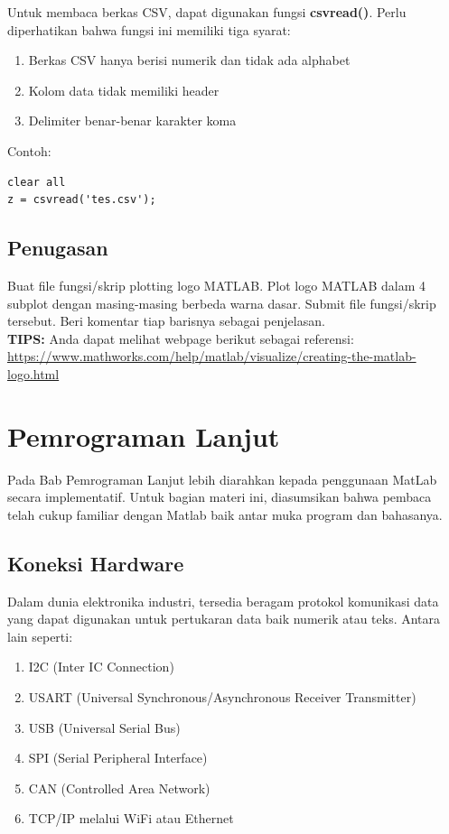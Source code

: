 \documentclass[12pt]{book}
\begin{document}
	Untuk membaca berkas CSV, dapat digunakan fungsi \textbf{csvread()}.
	Perlu diperhatikan bahwa fungsi ini memiliki tiga syarat:
	\begin{enumerate}
		\item Berkas CSV hanya berisi numerik dan tidak ada alphabet
		\item Kolom data tidak memiliki header
		\item Delimiter benar-benar karakter koma
	\end{enumerate}
	Contoh:
	\begin{verbatim}
clear all
z = csvread('tes.csv');
	\end{verbatim}

	\newpage
	\section{Penugasan}

	Buat file fungsi/skrip plotting logo MATLAB.
	Plot logo MATLAB dalam 4 subplot dengan masing-masing berbeda warna dasar.
	Submit file fungsi/skrip tersebut.
	Beri komentar tiap barisnya sebagai penjelasan.\\

	\textbf{TIPS:} Anda dapat melihat webpage berikut sebagai referensi:\\
	\url{https://www.mathworks.com/help/matlab/visualize/creating-the-matlab-logo.html}

	\newpage
	\chapter{Pemrograman Lanjut}

	Pada Bab Pemrograman Lanjut lebih diarahkan kepada penggunaan MatLab secara implementatif.
	Untuk bagian materi ini, diasumsikan bahwa pembaca telah cukup familiar dengan Matlab baik antar muka program dan bahasanya.

	\section{Koneksi Hardware}

	Dalam dunia elektronika industri, tersedia beragam protokol komunikasi data yang dapat digunakan untuk pertukaran data baik numerik atau teks.
	Antara lain seperti:
	\begin{enumerate}
		\item I2C (Inter IC Connection)
		\item USART (Universal Synchronous/Asynchronous Receiver Transmitter)
		\item USB (Universal Serial Bus)
		\item SPI (Serial Peripheral Interface)
		\item CAN (Controlled Area Network)
		\item TCP/IP melalui WiFi atau Ethernet
	\end{enumerate}
\end{document}

